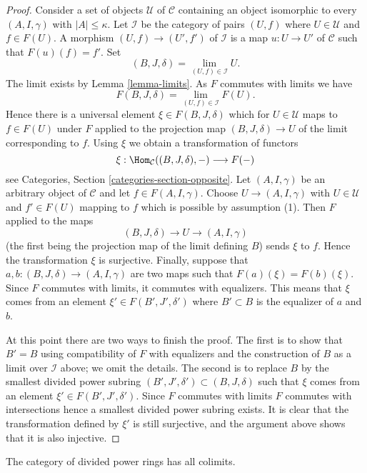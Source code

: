 \begin{proof}
Consider a set of objects $\mathcal{U}$ of $\mathcal{C}$ containing an
object isomorphic to every $(A, I, \gamma)$ with $|A| \leq \kappa$.
Let $\mathcal{I}$ be the category of pairs $(U, f)$ where $U \in \mathcal{U}$
and $f \in F(U)$. A morphism $(U, f) \to (U', f')$ of $\mathcal{I}$
is a map $u : U \to U'$ of $\mathcal{C}$ such that $F(u)(f) = f'$.
Set
$$
(B, J, \delta) = \lim_{(U, f) \in \mathcal{I}} U.
$$
The limit exists by Lemma \ref{lemma-limits}. As $F$ commutes with limits
we have
$$
F(B, J, \delta) = \lim_{(U, f) \in \mathcal{I}} F(U).
$$
Hence there is a universal element $\xi \in F(B, J, \delta)$ which
for $U \in \mathcal{U}$ maps to $f \in F(U)$ under $F$ applied to the
projection map $(B, J, \delta) \to U$ of the limit corresponding to $f$.
Using $\xi$ we obtain a transformation of functors
$$
\xi : \Hom_\mathcal{C}((B, J, \delta), - ) \longrightarrow F(-)
$$
see Categories, Section \ref{categories-section-opposite}.
Let $(A, I, \gamma)$ be an arbitrary object of $\mathcal{C}$ and
let $f \in F(A, I, \gamma)$. Choose $U \to (A, I, \gamma)$
with $U \in \mathcal{U}$ and $f' \in F(U)$ mapping to $f$ which is possible by
assumption (1). Then $F$ applied to the maps
$$
(B, J, \delta) \longrightarrow U \longrightarrow (A, I, \gamma)
$$
(the first being the projection map of the limit defining $B$)
sends $\xi$ to $f$. Hence the transformation $\xi$ is surjective.
Finally, suppose that $a, b : (B, J, \delta) \to (A, I, \gamma)$
are two maps such that $F(a)(\xi) = F(b)(\xi)$. Since $F$ commutes
with limits, it commutes with equalizers. This means that $\xi$
comes from an element $\xi' \in F(B', J', \delta')$ where $B' \subset B$
is the equalizer of $a$ and $b$.

\medskip\noindent
At this point there are two ways to finish the proof.
The first is to show that $B' = B$ using compatibility of $F$
with equalizers and the construction of $B$ as a limit over $\mathcal{I}$
above; we omit the details. The second is to replace $B$ by the
smallest divided power subring $(B', J', \delta') \subset (B, J, \delta)$
such that $\xi$ comes from an element $\xi' \in F(B', J', \delta')$.
Since $F$ commutes with limits $F$ commutes with intersections
hence a smallest divided power subring exists. It is clear that the
transformation defined by $\xi'$ is still surjective, and the argument above
shows that it is also injective.
\end{proof}

\begin{lemma}
\label{lemma-colimits}
The category of divided power rings has all colimits.
\end{lemma}

